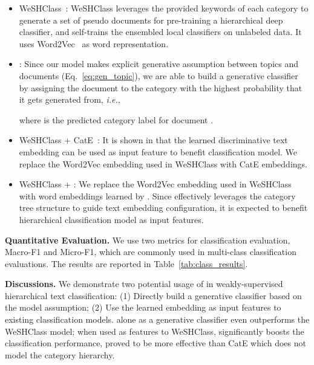 \documentclass[sigconf]{acmart}
\newcommand{\ie}{\emph{i.e.}}
\theoremstyle{definition}
\begin{document}
\begin{itemize}[wide, labelwidth=!, labelindent=0pt]
\item
WeSHClass~\cite{Meng2019WeaklySupervisedHT}: WeSHClass leverages the provided keywords of each category to generate a set of pseudo documents for pre-training a hierarchical deep classifier, and self-trains the ensembled local classifiers  on unlabeled data. It uses Word2Vec~\cite{Mikolov2013DistributedRO} as word representation.
\item
\josh: Since our model makes explicit generative assumption between topics and documents (Eq.~\eqref{eq:gen_topic}), we are able to build a generative classifier by assigning the document to the category with the highest probability that it gets generated from, \ie,

where  is the predicted category label for document .
\item 
WeSHClass + CatE~\cite{Meng2020DiscriminativeTM}: It is shown in \cite{Meng2020DiscriminativeTM} that the learned discriminative text embedding can be used as input feature to benefit classification model. We replace the Word2Vec embedding used in WeSHClass with CatE embeddings.
\item 
WeSHClass + \josh: We replace the Word2Vec embedding used in WeSHClass with word embeddings learned by \josh. Since \josh effectively leverages the category tree structure to guide text embedding configuration, it is expected to benefit hierarchical classification model as input features.
\end{itemize}

\noindent
\textbf{Quantitative Evaluation.}
We use two metrics for classification evaluation, Macro-F1 and Micro-F1, which are commonly used in multi-class classification evaluations. The results are reported in Table~\ref{tab:class_results}.

\noindent
\textbf{Discussions.} We demonstrate two potential usage of \josh in weakly-supervised hierarchical text classification: (1) Directly build a generative classifier based on the model assumption; (2) Use the learned embedding as input features to existing classification models. \josh alone as a generative classifier even outperforms the WeSHClass model;  when used as features to WeSHClass, \josh significantly boosts the classification performance,
proved to be more effective than CatE which does not model the category hierarchy.
\end{document}
